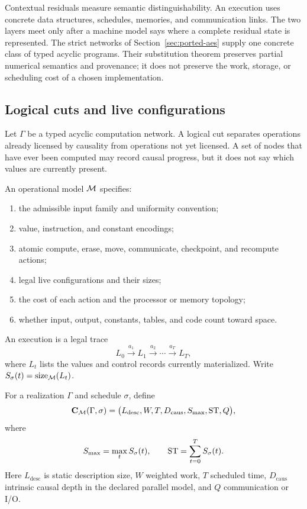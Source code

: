 Contextual residuals measure semantic distinguishability.  An execution uses
concrete data structures, schedules, memories, and communication links.  The
two layers meet only after a machine model says where a complete residual state
is represented.  The strict networks of Section~\ref{sec:ported-aes} supply one
concrete class of typed acyclic programs.  Their substitution theorem preserves
partial numerical semantics and provenance; it does not preserve the work,
storage, or scheduling cost of a chosen implementation.

\subsection{Logical cuts and live configurations}

Let $\Gamma$ be a typed acyclic computation network.  A logical cut separates
operations already licensed by causality from operations not yet licensed.  A
set of nodes that have ever been computed may record causal progress, but it
does not say which values are currently present.

\begin{definition}
An operational model $\mathcal M$ specifies:
\begin{enumerate}
  \item the admissible input family and uniformity convention;
  \item value, instruction, and constant encodings;
  \item atomic compute, erase, move, communicate, checkpoint, and recompute
  actions;
  \item legal live configurations and their sizes;
  \item the cost of each action and the processor or memory topology;
  \item whether input, output, constants, tables, and code count toward space.
\end{enumerate}
\end{definition}

An execution is a legal trace
\begin{equation}
  L_0\xrightarrow{a_1}L_1\xrightarrow{a_2}\cdots
  \xrightarrow{a_T}L_T,
  \label{eq:live-configuration-trace}
\end{equation}
where $L_t$ lists the values and control records currently materialized.
Write $S_\sigma(t)=\operatorname{size}_{\mathcal M}(L_t)$.

\begin{definition}
For a realization $\Gamma$ and schedule $\sigma$, define
\begin{equation}
 \mathbf C_{\mathcal M}(\Gamma,\sigma)
 =\bigl(
 L_{\mathrm{desc}},W,T,D_{\mathrm{caus}},S_{\max},\operatorname{ST},Q
 \bigr),
 \label{eq:resource-vector}
\end{equation}
where
\[
 S_{\max}=\max_t S_\sigma(t),
 \qquad
 \operatorname{ST}=\sum_{t=0}^{T}S_\sigma(t).
\]
Here $L_{\mathrm{desc}}$ is static description size, $W$ weighted work,
$T$ scheduled time, $D_{\mathrm{caus}}$ intrinsic causal depth in the declared
parallel model, and $Q$ communication or I/O.
\end{definition}

